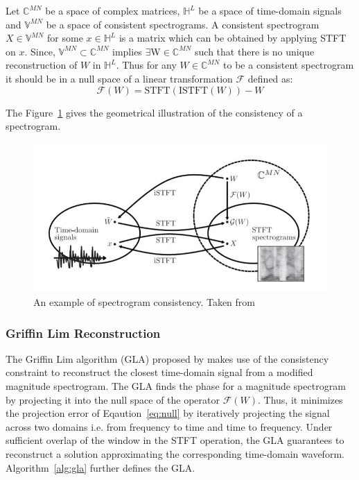 Let $\mathbb{C}^{M N}$ be a space of complex matrices, $\mathbb{H}^L$ be a space of time-domain signals and $\mathbb{V}^{M N}$ be a space of consistent spectrograms. A consistent spectrogram $X\in\mathbb{V}^{MN}$  for some $x\in\mathbb{H}^L$ is a matrix which can be obtained by applying STFT on $x$. Since, $\mathbb{V}^{MN} \subset \mathbb{C}^{MN}$ implies $\exists  $W$\in\mathbb{C}^{MN}$ such that there is no unique reconstruction of $W$ in $\mathbb{H}^L$. Thus for any $W\in\mathbb{C}^{MN}$ to be a consistent spectrogram it should be in a null space of a linear transformation $\mathcal{F}$ defined as:
\begin{equation}
\label{eq:null}
    \mathcal{F}(W) = \text{STFT}(\text{ISTFT}(W)) - W
\end{equation}

The Figure~\ref{fig:spec_con} gives the geometrical illustration of the consistency of a spectrogram.

\begin{figure}
    \centering
    \includegraphics[width=0.55\columnwidth]{master_thesis_template/figs/spec_consistency.JPG}
    \caption[Spectrogram consistency]{An example of spectrogram consistency. Taken from~\cite{le2010fast}}
    \label{fig:spec_con}
\end{figure}
\subsubsection{Griffin Lim Reconstruction}
\label{subsec:gla}
The Griffin Lim algorithm (GLA) proposed by \citet{griffin1984signal} makes use of the consistency constraint to reconstruct the closest time-domain signal from a modified magnitude spectrogram. The GLA finds the phase for a magnitude spectrogram by projecting it into the null space of the operator $\mathcal{F}(W)$. Thus, it minimizes the projection error of Eqaution~\ref{eq:null} by iteratively projecting the signal across two domains i.e. from frequency to time and time to frequency. Under sufficient overlap of the window in the STFT operation, the GLA guarantees to reconstruct a solution approximating the corresponding time-domain waveform. Algorithm~\ref{alg:gla} further defines the GLA.

